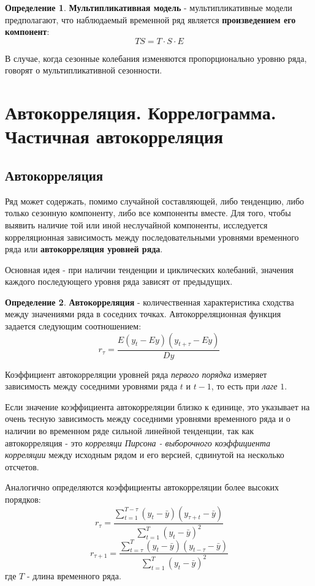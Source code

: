 \documentclass[aps,%
12pt,%
final,%
oneside,
onecolumn,%
musixtex, %
superscriptaddress,%
centertags]{article} %
\theoremstyle{plain}
\theoremstyle{definition}
\newtheorem{definition}{Определение}[subsection]
\theoremstyle{remark}
\begin{document}
\begin{definition}
	\textbf{Мультипликативная модель} - мультипликативные модели предполагают, что наблюдаемый временной ряд является \textbf{произведением его компонент}:
	$$TS = T \cdot S \cdot E$$

	В случае, когда сезонные колебания изменяются пропорционально уровню ряда, говорят о мультипликативной сезонности.
\end{definition}

\newpage

\section{Автокорреляция. Коррелограмма. Частичная автокорреляция}

\subsection{Автокорреляция}

Ряд может содержать, помимо случайной составляющей, либо тенденцию, либо только сезонную компоненту, либо все компоненты вместе. Для того, чтобы выявить наличие той или иной неслучайной компоненты, исследуется корреляционная зависимость между последовательными уровнями временного ряда или \textbf{автокорреляция уровней ряда}.

Основная идея - при наличии тенденции и циклических колебаний, значения каждого последующего уровня ряда зависят от предыдущих.

\begin{definition}
	\textbf{Автокорреляция} - количественная характеристика сходства между значениями ряда в соседних точках.  Автокорреляционная функция задается следующим соотношением:
	$$r_{\tau} = \frac{E(y_t-Ey)(y_{t+\tau}-Ey)}{Dy}$$
\end{definition}

Коэффициент автокорреляции уровней ряда \textit{первого порядка} измеряет зависимость между соседними уровнями ряда $t$ и $t-1$, то есть при \textit{лаге} $1$.

Если значение коэффициента автокорреляции близко к единице, это указывает на очень тесную зависимость между соседними уровнями временного ряда и о наличии во временном ряде сильной линейной тенденции, так как автокорреляция - это \textit{корреляци Пирсона - выборочного коэффициента корреляции} между исходным рядом и его версией, сдвинутой на несколько отсчетов.

Аналогично определяются коэффициенты автокорреляции более высоких порядков:
$$r_{\tau} = \frac{\sum\limits_{t=1}^{T-\tau} (y_t - \bar{y})(y_{\tau+t} - \bar{y})}{\sum\limits_{t=1}^T (y_t - \bar{y})^2}$$
$$r_{\tau+1} = \frac{\sum\limits_{t=\tau}^{T} (y_t - \bar{y})(y_{t-\tau} - \bar{y})}{\sum\limits_{t=1}^T (y_t - \bar{y})^2}$$
где $T$ - длина временного ряда.
\end{document}
